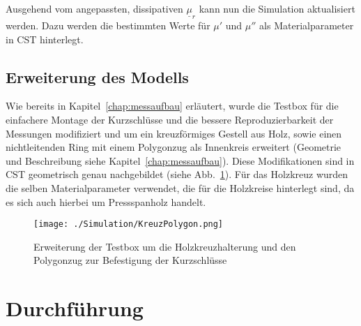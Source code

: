             Ausgehend vom angepassten, dissipativen $\underline{\mu}_r$ kann nun die Simulation aktualisiert werden. Dazu werden die bestimmten Werte für $\mu'$ und $\mu''$ als Materialparameter in CST hinterlegt.
           
        \subsection{Erweiterung des Modells}
        Wie bereits in Kapitel~\ref{chap:messaufbau} erläutert, wurde die Testbox für die einfachere Montage der Kurzschlüsse und die bessere Reproduzierbarkeit der Messungen modifiziert und um ein kreuzförmiges Gestell aus Holz, sowie einen nichtleitenden Ring mit einem Polygonzug als Innenkreis erweitert (Geometrie und Beschreibung siehe Kapitel~\ref{chap:messaufbau}). Diese Modifikationen sind in CST geometrisch genau nachgebildet (siehe Abb.~\ref{fig:KreuzPolygonCST}). Für das Holzkreuz wurden die selben Materialparameter verwendet, die für die Holzkreise hinterlegt sind, da es sich auch hierbei um Pressspanholz handelt.
        
            \begin{figure}[htb]
                \centering
                \texttt{[image: ./Simulation/KreuzPolygon.png]}
                \caption{Erweiterung der Testbox um die Holzkreuzhalterung und den Polygonzug zur Befestigung der Kurzschlüsse}
                \label{fig:KreuzPolygonCST}
            \end{figure}
        
    \section{Durchführung}
